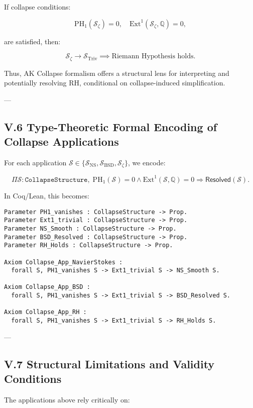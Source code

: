 \documentclass[11pt]{article}
\begin{document}
If collapse conditions:

\[
\mathrm{PH}_1(\mathcal{S}_{\zeta}) = 0, \quad \mathrm{Ext}^1(\mathcal{S}_{\zeta}, \mathbb{Q}) = 0,
\]

are satisfied, then:

\[
\mathcal{S}_{\zeta} \longrightarrow \mathcal{S}_{\mathrm{Triv}} \implies \text{Riemann Hypothesis holds}.
\]

Thus, AK Collapse formalism offers a structural lens for interpreting and potentially resolving RH, conditional on collapse-induced simplification.


---

\subsection*{V.6 Type-Theoretic Formal Encoding of Collapse Applications}

For each application $\mathcal{S} \in \{\mathcal{S}_{\mathrm{NS}}, \mathcal{S}_{\mathrm{BSD}}, \mathcal{S}_{\zeta}\}$, we encode:

\[
\Pi \mathcal{S} : \texttt{CollapseStructure},\;
\mathrm{PH}_1(\mathcal{S}) = 0 \wedge \mathrm{Ext}^1(\mathcal{S}, \mathbb{Q}) = 0
\Rightarrow
\mathsf{Resolved}(\mathcal{S}).
\]

In Coq/Lean, this becomes:

\begin{lstlisting}[language=Coq]
Parameter PH1_vanishes : CollapseStructure -> Prop.
Parameter Ext1_trivial : CollapseStructure -> Prop.
Parameter NS_Smooth : CollapseStructure -> Prop.
Parameter BSD_Resolved : CollapseStructure -> Prop.
Parameter RH_Holds : CollapseStructure -> Prop.

Axiom Collapse_App_NavierStokes :
  forall S, PH1_vanishes S -> Ext1_trivial S -> NS_Smooth S.

Axiom Collapse_App_BSD :
  forall S, PH1_vanishes S -> Ext1_trivial S -> BSD_Resolved S.

Axiom Collapse_App_RH :
  forall S, PH1_vanishes S -> Ext1_trivial S -> RH_Holds S.
\end{lstlisting}

---

\subsection*{V.7 Structural Limitations and Validity Conditions}

The applications above rely critically on:
\end{document}
